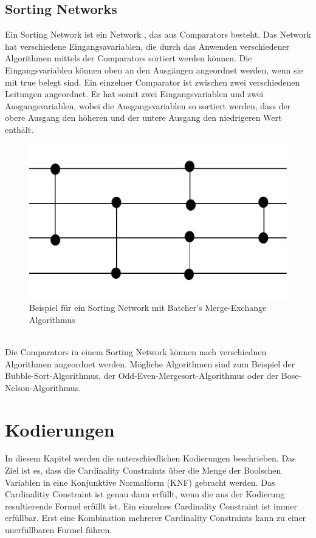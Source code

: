 \documentclass[a4,abstract=on]{scrartcl}
\newcommand*\stdsection{}
\let\stdsection\section
\renewcommand*\section{%
    \clearpage\ifodd\value{page}\else\mbox{}\clearpage\fi
    \stdsection}
\begin{document}
\subsection{Sorting Networks}
Ein Sorting Network ist ein Network \cite[vgl.][]{sorting}, das aus Comparators besteht. Das Network hat verschiedene Eingangsavariablen, die durch das Anwenden verschiedener Algorithmen mittels der Comparators sortiert werden können. Die Eingangsvariablen können oben an den Ausgängen angeordnet werden, wenn sie mit true belegt sind. Ein einzelner Comparator ist zwischen zwei verschiedenen Leitungen angeordnet. Er hat somit zwei Eingangsvariablen und zwei Ausgangsvariablen, wobei die Ausgangsvariablen so sortiert werden, dass der obere Ausgang den höheren und der untere Ausgang den niedrigeren Wert enthält.

\begin{figure}[H]
\centering
\includegraphics[width=\textwidth]{sorting_network_grundlage1.pdf}
\caption{Beispiel für ein Sorting Network mit Batcher's Merge-Exchange Algorithmus}
\label{fig:network_grundlage}
\end{figure}
\ \\
Die Comparators in einem Sorting Network können nach verschiednen Algorithmen angeordnet werden. Mögliche Algorithmen sind zum Beispiel der Bubble-Sort-Algorithmus, der Odd-Even-Mergesort-Algorithmus oder der Bose-Nelson-Algorithmus.

\section{Kodierungen}
In diesem Kapitel werden die unterschiedlichen Kodierungen beschrieben. Das Ziel ist es, dass die Cardinality Constraints über die Menge der Boolschen Variablen in eine Konjunktive Normalform (KNF) gebracht werden. %
Das Cardinalitiy Constraint ist genau dann erfüllt, wenn die aus der Kodierung resultierende Formel erfüllt ist. Ein einzelnes Cardinality Constraint ist immer erfüllbar. Erst eine Kombination mehrerer Cardinality Constraints kann zu einer unerfüllbaren Formel führen.
\end{document}
